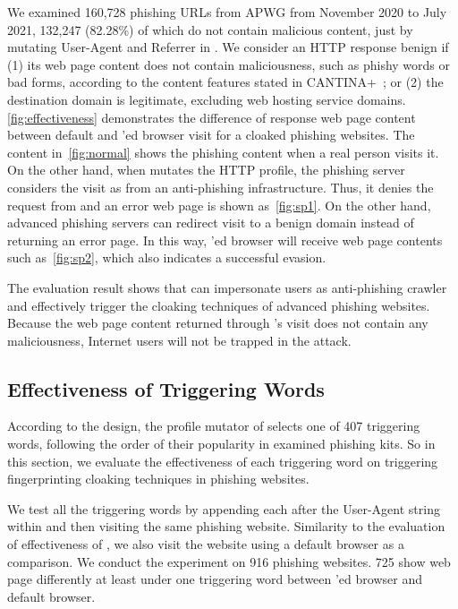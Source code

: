We examined 160,728 phishing URLs from APWG from November 2020 to July 2021,
132,247 (82.28\%) of which do not contain malicious content, just by mutating User-Agent and Referrer in \spartacus.
We consider an HTTP response benign if (1) its web page content does not contain maliciousness, such as phishy words or bad forms, according to the content features stated in CANTINA+~\cite{xiang2011cantina+};
or (2) the destination domain is legitimate, excluding web hosting service domains.
\autoref{fig:effectiveness} demonstrates the difference of response web page content between default and \spartacus'ed browser visit for a cloaked phishing websites.
The content in~\autoref{fig:normal} shows the phishing content when a real person visits it.
On the other hand, 
when \spartacus mutates the HTTP profile,
the phishing server considers the visit as from an anti-phishing infrastructure.
Thus, it denies the request from \spartacus and an error web page is shown as~\autoref{fig:sp1}.
On the other hand, advanced phishing servers can redirect visit to a benign domain instead of returning an error page.
In this way, \spartacus'ed browser will receive web page contents such as~\autoref{fig:sp2},
which also indicates a successful evasion.

The evaluation result shows that \spartacus can impersonate users as anti-phishing crawler and effectively trigger the cloaking techniques of advanced phishing websites.
Because the web page content returned through \spartacus's visit does not contain any maliciousness, Internet users will not be trapped in the attack.



\subsection{Effectiveness of Triggering Words}

According to the design, the profile mutator of \spartacus selects one of 407 triggering words, following the order of their popularity in examined phishing kits.
So in this section, we evaluate the effectiveness of each triggering word on triggering fingerprinting cloaking techniques in phishing websites.

\newcommand{\senstotalphishing}{916\xspace}
\newcommand{\sensevadephishing}{725\xspace}

We test all the triggering words by appending each after the User-Agent string within \spartacus and then visiting the same phishing website.
Similarity to the evaluation of effectiveness of \spartacus, we also visit the website using a default browser as a comparison.
We conduct the experiment on \senstotalphishing phishing websites.
\sensevadephishing show web page differently at least under one triggering word between \spartacus'ed browser and default browser.

